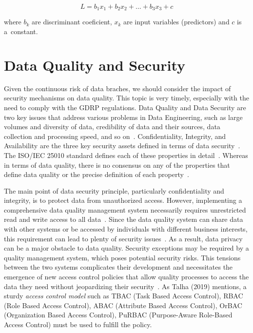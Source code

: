 \begin{equation*}
    L = b_1 x_1 + b_2 x_2 + \ldots + b_3 x_3 + c
\end{equation*}

where \( b_k \) are discriminant coeficient, \( x_k \) are input variables (predictors) and \( c \) is a~constant.

\section{Data Quality and Security}

Given the continuous risk of data braches, we should consider the impact of security mechanisms on data quality.
This topic is very timely, especially with the need to comply with the GDRP regulations.
Data Quality and Data Security are two key issues that address various problems in Data Engineering, such as large volumes and diversity of data, credibility of data and their sources, data collection and processing speed, and so on~\cite{talha2019}.
Confidentiality, Integrity, and Availability are the three key security assets defined in terms of data security~\cite{talha2019}.
The ISO/IEC 25010 standard defines each of these properties in detail~\cite{iso25010}.
Whereas in terms of data quality, there is no consensus on any of the properties that define data quality or the precise definition of each property~\cite{batini2009}.

The main point of data security principle, particularly confidentiality and integrity, is to protect data from unauthorized access.
However, implementing a comprehensive data quality management system necessarily requires unrestricted read and write access to all data~\cite{talha2019}.
Since the data quality system can share data with other systems or be accessed by individuals with different business interests, this requirement can lead to plenty of security issues~\cite{talha2019}.
As a result, data privacy can be a major obstacle to data quality.
Security exceptions may be required by a quality management system, which poses potential security risks.
This tensions between the two systems complicates their development and necessitates the emergence of new access control policies that allow quality processes to access the data they need without jeopardizing their security~\cite{talha2019}.
As Talha (2019) mentions, a sturdy \textit{access control model} such as TBAC (Task Based Access Control), RBAC (Role Based Access Control), ABAC (Attribute Based Access Control), OrBAC (Organization Based Access Control), PuRBAC (Purpose-Aware Role-Based Access Control) must be used to fulfill the policy.

